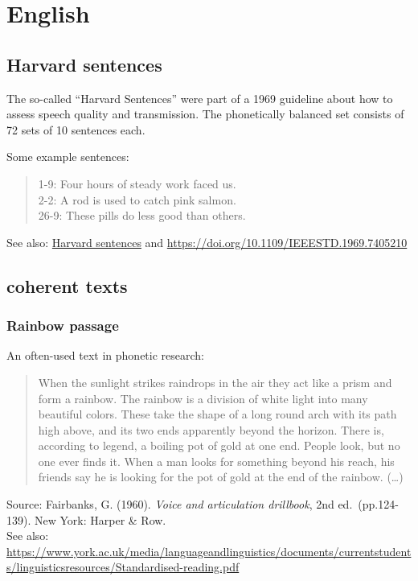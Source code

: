 \documentclass[
]{book}
\begin{document}
\section{English}\label{english}

\subsection{Harvard sentences}\label{harvard-sentences}

The so-called ``Harvard Sentences'' were part of a 1969 guideline about how to assess speech quality and transmission. The phonetically balanced set consists of 72 sets of 10 sentences each.

Some example sentences:

\begin{quote}
1-9: Four hours of steady work faced us.\\
2-2: A rod is used to catch pink salmon.\\
26-9: These pills do less good than others.
\end{quote}

See also: \href{https://en.wikipedia.org/wiki/Harvard_sentences}{Harvard sentences} and \url{https://doi.org/10.1109/IEEESTD.1969.7405210}

\subsection{coherent texts}\label{coherent-texts-1}

\subsubsection{Rainbow passage}\label{rainbow-passage}

An often-used text in phonetic research:

\begin{quote}
When the sunlight strikes raindrops in the air they act like a prism and form a rainbow.
The rainbow is a division of white light into many beautiful colors.
These take the shape of a long round arch with its path high above, and its two ends apparently beyond the horizon.
There is, according to legend, a boiling pot of gold at one end.
People look, but no one ever finds it.
When a man looks for something beyond his reach, his friends say he is looking for the pot of gold at the end of the rainbow. (\ldots)
\end{quote}

Source: Fairbanks, G. (1960). \emph{Voice and articulation drillbook}, 2nd ed.~(pp.124-139). New York: Harper \& Row.\\
See also: \url{https://www.york.ac.uk/media/languageandlinguistics/documents/currentstudents/linguisticsresources/Standardised-reading.pdf}
\end{document}
